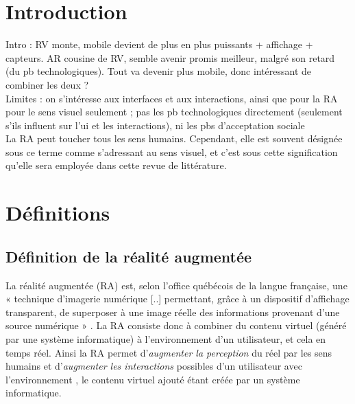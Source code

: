 \section*{Introduction}
Intro : RV monte, mobile devient de plus en plus puissants + affichage + capteurs. AR cousine de RV, semble avenir promis meilleur, malgré son retard (du pb technologiques). Tout va devenir plus mobile, donc intéressant de combiner les deux ?
\cite{DeSaChurchill2013} \\
Limites : on s'intéresse aux interfaces et aux interactions, ainsi que pour la RA pour le sens visuel seulement ; pas les pb technologiques directement (seulement s'ils influent sur l'ui et les interactions), ni les pbs d'acceptation sociale \\

La RA peut toucher tous les sens humains. Cependant, elle est souvent désignée sous ce terme comme s'adressant au sens visuel, et c'est sous cette signification qu'elle sera employée dans cette revue de littérature.


\section*{Définitions}
\subsection*{Définition de la réalité augmentée}
La réalité augmentée (RA) est, selon l'office québécois de la langue française, une « technique d'imagerie numérique [..] permettant, grâce à un dispositif d'affichage transparent, de superposer à une image réelle des informations provenant d'une source numérique » \citep{OfficeQuebecoisLangueFrancaiseRA2015}. La RA consiste donc à combiner du contenu virtuel (généré par une système informatique) à l'environnement d'un utilisateur, et cela en temps réel. Ainsi la RA permet d'\emph{augmenter la perception} du réel par les sens humains et d'\emph{augmenter les interactions} possibles d'un utilisateur avec l'environnement \citep{Azuma1997}, le contenu virtuel ajouté étant créée par un système informatique.

